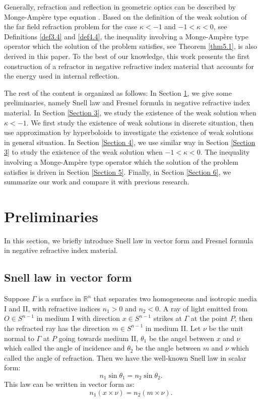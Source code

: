 \documentclass[a4paper,12pt,]{article}
\numberwithin{equation}{section}
\numberwithin{equation}{section} \allowdisplaybreaks
\begin{document}
Generally, refraction and reflection in geometric optics can be described by Monge-Amp\`ere type equation \cite{Ji23,JT14,JT18,LW21,Wa96}. Based on the definition of the weak solution of the far field refraction problem for the case $\kappa<-1$ and $-1<\kappa<0$, see {Definitions \ref{def3.4} and \ref{def4.4}}, the inequality involving a Monge-Amp\`ere type operator which the solution of the problem satisfies, see Theorem \ref{thm5.1}, is also derived in this paper. To the best of our knowledge, this work presents the first construction of a refractor in negative refractive index material that accounts for the energy used in internal reflection.

The rest of the content is organized as follows: In Section \ref{Section 2}, we give some preliminaries, namely Snell law and Fresnel formula in negative refractive index material. In Section \ref{Section 3}, we study the existence of the weak solution when $\kappa<-1$. We first study the existence of weak solutions in discrete situation, then use approximation by hyperboloids to investigate the existence of weak solutions in general situation. In Section \ref{Section 4}, we use similar way in Section \ref{Section 3} to study the existence of the weak solution when $-1<\kappa<0$. The inequality involving a Monge-Amp\`ere type operator which the solution of the problem satisfies is driven in Section \ref{Section 5}. Finally, in Section \ref{Section 6}, we summarize our work and compare it with previous research.

\section{Preliminaries}\label{Section 2}

\sloppy{}

In this section, we briefly introduce Snell law in vector form and Fresnel formula in negative refractive index material.

\subsection{Snell law in vector form}

Suppose $\Gamma$ is a surface in $\mathbb{R}^{n}$ that separates two homogeneous and isotropic media \textsc{I} and \textsc{II}, with refractive indices $n_{1}>0$ and $n_{2}<0$. A ray of light emitted from $O\in S^{n-1}$ in medium \textsc{I} with direction $x\in S^{n-1}$ strikes at $\Gamma$ at the point $P$, then the refracted ray has the direction $m\in S^{n-1}$ in medium \textsc{II}. Let $\nu$ be the unit normal to $\Gamma$ at $P$ going towards medium \textsc{II}, $\theta_{1}$ be the angel between $x$ and $\nu$ which called the angle of incidence and $\theta_{2}$ be the angle between $m$ and $\nu$ which called the angle of refraction. Then we have the well-known Snell law in scalar form:
\begin{equation}\label{2.1}
  n_{1}\sin\theta_{1} = n_{2}\sin\theta_{2}.
\end{equation}
This law can be written in vector form as:
\begin{equation}\label{2.2}
  n_{1}(x\times\nu) = n_{2}(m\times\nu).
\end{equation}
\end{document}
